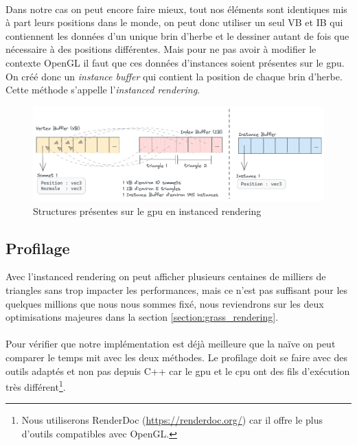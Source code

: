 \documentclass{EPUProjetDi}
\begin{document}
\paragraph{}
Dans notre cas on peut encore faire mieux, tout nos éléments sont identiques mis à part leurs positions dans le monde, on peut donc utiliser un seul VB et IB qui contiennent les données d'un unique brin d'herbe et le dessiner autant de fois que nécessaire à des positions différentes. Mais pour ne pas avoir à modifier le contexte OpenGL il faut que ces données d'instances soient présentes sur le gpu. On créé donc un \textit{instance buffer} qui contient la position de chaque brin d'herbe. Cette méthode s'appelle l'\textit{instanced rendering}.

\begin{figure}[ht]
	\centering
	\includegraphics[scale=.4]{grass_vbibib}
	\caption{Structures présentes sur le gpu en instanced rendering}
	\label{fig:grass_vbibib}
\end{figure}

\subsection{Profilage}
Avec l'instanced rendering on peut afficher plusieurs centaines de milliers de triangles sans trop impacter les performances, mais ce n'est pas suffisant pour les quelques millions que nous nous sommes fixé, nous reviendrons sur les deux optimisations majeures dans la section \ref{section:grass_rendering}.
\paragraph{}
 Pour vérifier que notre implémentation est déjà meilleure que la naïve on peut comparer le temps mit avec les deux méthodes. Le profilage doit se faire avec des outils adaptés et non pas depuis C++ car le gpu et le cpu ont des fils d'exécution très différent\footnote{Nous utiliserons RenderDoc (\url{https://renderdoc.org/}) car il offre le plus d'outils compatibles avec OpenGL.}.
\end{document}

